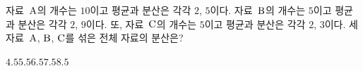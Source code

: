 자료~$\mathrm{A}$의 개수는 $10$이고 평균과 분산은 각각 $2$, $5$이다. 자료~$\mathrm{B}$의 개수는 $5$이고 평균과 분산은 각각 $2$, $9$이다. 또, 자료~$\mathrm{C}$의 개수는 $5$이고 평균과 분산은 각각 $2$, $3$이다. 세 자료~$\mathrm{A}$, $\mathrm{B}$, $\mathrm{C}$를 섞은 전체 자료의 분산은?
\begin{choices32}{$4.5$}{$5.5$}{$6.5$}{$7.5$}{$8.5$}\end{choices32}
